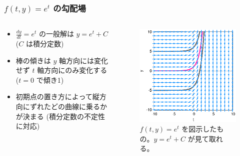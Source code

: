 \documentclass[dvipdfmx,aspectratio=169,20pt]{beamer}
\newcommand{\myfontsetting}[3]{{\fontsize{#1}{#2}\selectfont #3}}
\begin{document}
\begin{frame}
\frametitle{\myfontsetting{28pt}{28pt}{[図解] $f(t,y) = e^t$ の勾配場}}
\begin{columns}[t]
\begin{column}{0.48\textwidth} 
\vspace{-8mm}
\begin{itemize}
    \item 
    \myfontsetting{12pt}{12pt}{
    $\frac{dy}{dt} = e^t$ の一般解は $y=e^t+C$ \myfontsetting{10pt}{10pt}{($C$ は積分定数)}
    }
    \vspace{-1mm}
    \item 
    \myfontsetting{12pt}{12pt}{
    棒の傾きは $y$ 軸方向には変化せず $t$ 軸方向にのみ変化する
    }\\
    \vspace{-2mm}
    \myfontsetting{6pt}{6pt}{
    ($t=0$ で傾き1)
    }
    \vspace{-1mm}
    \item \myfontsetting{12pt}{12pt}{
        初期点の置き方によって縦方向にずれたどの曲線に乗るかが決まる
        \myfontsetting{10pt}{10pt}{(積分定数の不定性に対応)}
        }
\end{itemize}
\end{column}

\begin{column}{0.52\textwidth} 
\begin{figure}[h]
	\begin{center}
\vspace{-10mm}
    	\includegraphics[width=1.0\textwidth]{fig12-5_differential_equation_exp.eps}
	\end{center}
	\vspace{-5mm}
	\caption{\myfontsetting{10pt}{10pt}{$f(t,y)=e^t$ を図示したもの。$y=e^t+C$ が見て取れる。}}
\end{figure}
\end{column}
\end{columns}
\end{frame}
\end{document}
